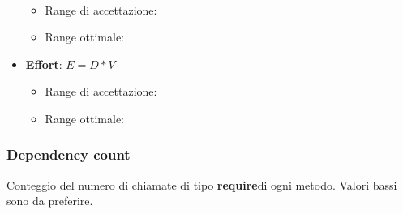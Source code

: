\documentclass[a4paper,11pt]{article}
\begin{document}
\begin{itemize}
\begin{math}
\end{math}
\begin{itemize}
	\item Range di accettazione: \begin{math}[0 - 30]\end{math}
	\item Range ottimale: \begin{math}[0 - 15]\end{math}
	\end{itemize}
\item \textbf{Effort}: 
\begin{math}
E = D * V
\end{math}
\begin{itemize}
	\item Range di accettazione: \begin{math}[0 - 400]\end{math}
	\item Range ottimale: \begin{math}[0 - 300]\end{math}
	\end{itemize}
\end{itemize} 
\subsubsection{Dependency count}
Conteggio del numero di chiamate di tipo \textbf{require}\addglos di ogni metodo. Valori bassi sono da preferire.
\end{document}
